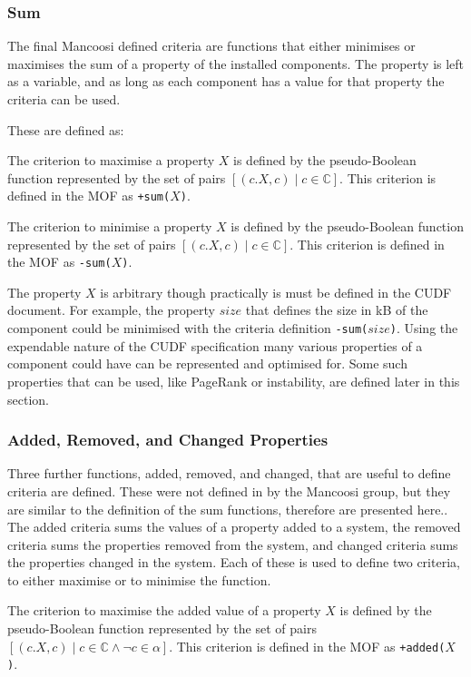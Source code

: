 \subsubsection{Sum}
The final Mancoosi defined criteria are functions that either minimises or maximises the sum of a property of the installed components. 
The property is left as a variable, and as long as each component has a value for that property the criteria can be used.

These are defined as:
\begin{defs}
The criterion to maximise a property $X$ is defined by the pseudo-Boolean function 
represented by the set of pairs $[(c.X, c) \mid c \in \mathbb{C}]$.
This criterion is defined in the MOF as \verb!+sum(!$X$\verb+)+.
\end{defs}

\begin{defs}
The criterion to minimise a property $X$ is defined by the pseudo-Boolean function 
represented by the set of pairs $[(c.X, c) \mid c \in \mathbb{C}]$.
This criterion is defined in the MOF as \verb+-sum(+$X$\verb+)+.
\end{defs}

The property $X$ is arbitrary though practically is must be defined in the CUDF document.
For example, the property $size$ that defines the size in kB of the component could be minimised with the criteria definition \verb+-sum(+$size$\verb+)+.
Using the expendable nature of the CUDF specification many various properties of a component could have can be represented and optimised for.
Some such properties that can be used, like PageRank or instability, are defined later in this section.

\subsubsection{Added, Removed, and Changed Properties}
Three further functions, added, removed, and changed, that are useful to define criteria are defined.
These were not defined in by the Mancoosi group, but they are similar to the definition of the sum functions, therefore are presented here..
The added criteria sums the values of a property added to a system, 
the removed criteria sums the properties removed from the system,
 and changed criteria sums the properties changed in the system. 
Each of these is used to define two criteria, to either maximise or to minimise the function.

\begin{defs}
The criterion to maximise the added value of a property $X$ is defined by the pseudo-Boolean function 
represented by the set of pairs $[(c.X, c) \mid c \in \mathbb{C} \wedge \neg c \in \alpha]$.
This criterion is defined in the MOF as \verb!+added(!$X$\verb+)+.
\end{defs}

